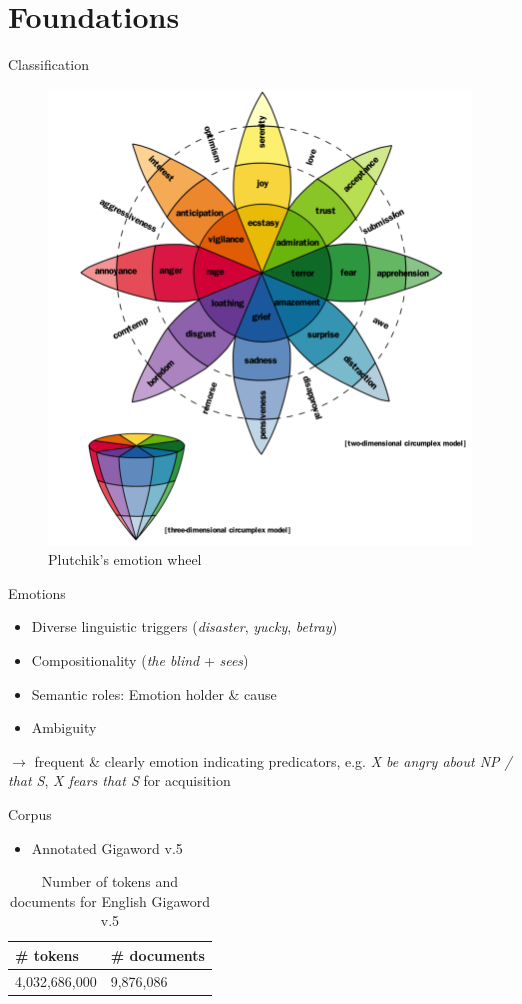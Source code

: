 \documentclass[11pt]{beamer}
\begin{document}
\section{Foundations}

\begin{frame}{Classification}
\begin{figure}[bth]
\includegraphics[width=.60\linewidth]{gfx/plutchik_wheel_emotion.png}
\caption{Plutchik's emotion wheel \cite{plutchik}}\label{fig:plutchik}
\end{figure}
\end{frame}

\begin{frame}{Emotions}
	\begin{itemize}
		\item Diverse linguistic triggers (\textit{disaster}, \textit{yucky}, \textit{betray})
		\item Compositionality (\textit{the blind} + \textit{sees})
		\item Semantic roles: Emotion holder \& cause
		\item Ambiguity
	\end{itemize}
$\rightarrow$ frequent \& clearly emotion indicating predicators, e.g. \textit{X be angry about NP / that S}, \textit{X fears that S} for acquisition	
\end{frame} 

\begin{frame}{Corpus}
\begin{itemize}
	\item Annotated Gigaword v.5 \cite{annotated_gigaword}
\end{itemize}

\begin{table}[h]
\centering
\begin{tabular}{l|l}
{\bf \# tokens} & {\bf \# documents}\\\hline
4,032,686,000   & 9,876,086
\end{tabular}
\caption{Number of tokens and documents for English Gigaword v.5}
\label{tab:gigaword}
\end{table}

\end{frame}
\end{document}
